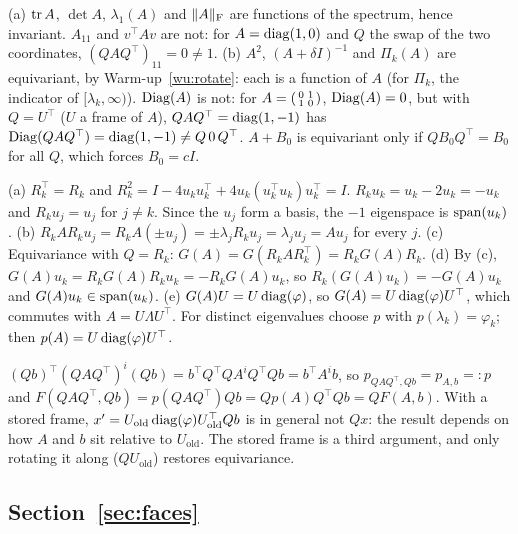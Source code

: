 (a) $\operatorname{tr} A$, $\det A$, $\lambda_1(A)$ and $\lVert A\rVert_{\mathrm{F}}$ are functions of the spectrum, hence invariant. $A_{11}$ and
$v^\top Av$ are not: for $A=\operatorname{diag}(1,0)$ and $Q$ the swap of the two coordinates, $(QAQ^\top)_{11}=0\ne1$.
\newline (b) $A^2$, $(A+\delta I)^{-1}$ and $\Pi_k(A)$ are equivariant, by Warm-up~\ref{wu:rotate}: each is a function of $A$
(for $\Pi_k$, the indicator of $[\lambda_k,\infty)$). $\operatorname{Diag}(A)$ is not: for
$A=\begin{psmallmatrix}0&1\\1&0\end{psmallmatrix}$, $\operatorname{Diag}(A)=0$, but with $Q=U^\top$ ($U$ a frame of $A$),
$QAQ^\top=\operatorname{diag}(1,-1)$ has $\operatorname{Diag}(QAQ^\top)=\operatorname{diag}(1,-1)\ne Q\,0\,Q^\top$. $A+B_0$ is equivariant only if
$QB_0Q^\top=B_0$ for all $Q$, which forces $B_0=cI$.

(a) $R_k^\top=R_k$ and $R_k^2=I-4u_ku_k^\top+4u_k(u_k^\top u_k)u_k^\top=I$. $R_ku_k=u_k-2u_k=-u_k$ and $R_ku_j=u_j$
for $j\ne k$. Since the $u_j$ form a basis, the $-1$ eigenspace is $\operatorname{span}(u_k)$.
\newline (b) $R_kAR_ku_j=R_kA(\pm u_j)=\pm\lambda_jR_ku_j=\lambda_ju_j=Au_j$ for every $j$.
\newline (c) Equivariance with $Q=R_k$: $G(A)=G(R_kAR_k^\top)=R_kG(A)R_k$.
\newline (d) By (c), $G(A)u_k=R_kG(A)R_ku_k=-R_kG(A)u_k$, so $R_k(G(A)u_k)=-G(A)u_k$ and $G(A)u_k\in\operatorname{span}(u_k)$.
\newline (e) $G(A)U=U\operatorname{diag}(\varphi)$, so $G(A)=U\operatorname{diag}(\varphi)U^\top$, which commutes with $A=U\Lambda U^\top$. For distinct
eigenvalues choose $p$ with $p(\lambda_k)=\varphi_k$; then $p(A)=U\operatorname{diag}(\varphi)U^\top$.

$(Qb)^\top(QAQ^\top)^i(Qb)=b^\top Q^\top QA^iQ^\top Qb=b^\top A^ib$, so $p_{QAQ^\top,Qb}=p_{A,b}=:p$ and
$F(QAQ^\top,Qb)=p(QAQ^\top)Qb=Qp(A)Q^\top Qb=QF(A,b)$. With a stored frame,
$x'=U_{\mathrm{old}}\operatorname{diag}(\varphi)U_{\mathrm{old}}^\top Qb$ is in general not $Qx$: the result depends on how $A$ and $b$
sit relative to $U_{\mathrm{old}}$. The stored frame is a third argument, and only rotating it along ($QU_{\mathrm{old}}$)
restores equivariance.

\subsection*{Section~\ref{sec:faces}}

